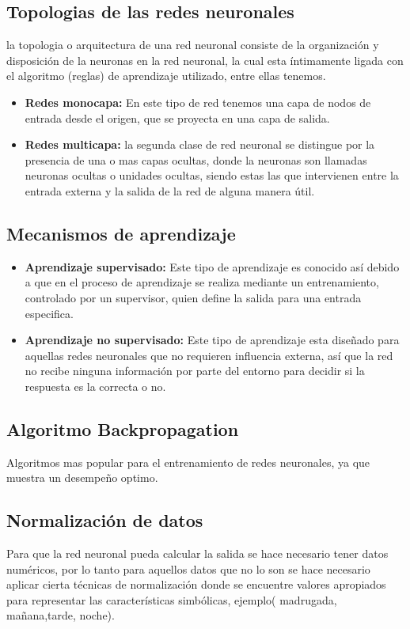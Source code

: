 \subsection{Topologias de las redes neuronales}
la topologia o arquitectura de una red neuronal consiste de la organización y disposición de la neuronas en la red neuronal, la cual esta íntimamente ligada con el algoritmo (reglas) de aprendizaje utilizado, entre ellas tenemos.
\begin{itemize}
 \item \textbf{Redes monocapa:}
 En este tipo de red tenemos una capa de nodos de entrada desde el origen, que se proyecta en una capa de salida.
 \item \textbf{Redes multicapa:}
 la segunda clase de red neuronal se distingue por la presencia de una o mas capas ocultas, donde la neuronas son llamadas neuronas ocultas o unidades ocultas, siendo estas las que intervienen entre la entrada externa y la salida de la red de alguna manera útil.
 
\end{itemize}
\subsection{Mecanismos de aprendizaje}
 
\begin{itemize}
\item \textbf{Aprendizaje supervisado:}
Este tipo de aprendizaje es conocido así debido a que en el proceso de aprendizaje se realiza mediante un entrenamiento, controlado por un supervisor, quien define la salida para una entrada especifica.\\
\item \textbf{Aprendizaje no supervisado:} 
Este tipo de aprendizaje esta diseñado para aquellas redes neuronales que no requieren influencia externa, así que la red no recibe ninguna información por parte del entorno para decidir si la respuesta es la correcta o no.
\end{itemize}
\subsection{Algoritmo Backpropagation}

Algoritmos mas popular para el entrenamiento de redes neuronales, ya que muestra un desempeño optimo. 

\subsection{Normalización de datos}

Para que la red neuronal pueda calcular la salida se hace necesario tener datos numéricos, por lo tanto para aquellos datos que no lo son se hace necesario aplicar cierta técnicas de normalización donde se encuentre valores apropiados para representar las características simbólicas, ejemplo(  madrugada, mañana,tarde, noche).


